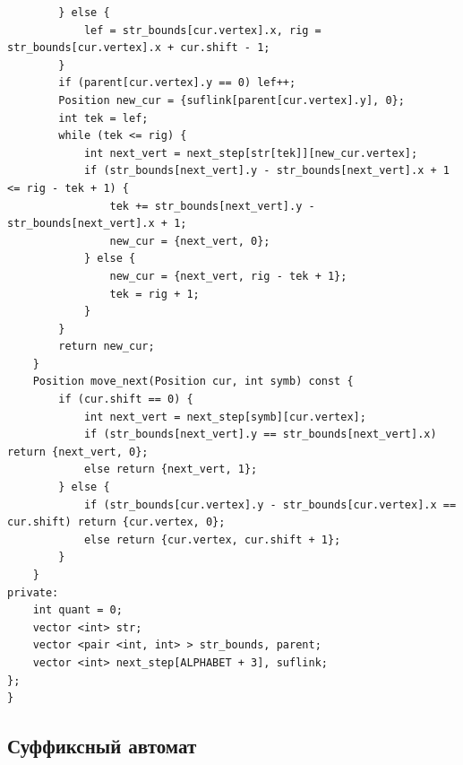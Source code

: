 \documentclass[10pt, portrait,letterpaper]{article}
\begin{document}
\begin{verbatim}
        } else {
            lef = str_bounds[cur.vertex].x, rig = str_bounds[cur.vertex].x + cur.shift - 1; 	
        }
        if (parent[cur.vertex].y == 0) lef++;
        Position new_cur = {suflink[parent[cur.vertex].y], 0};
        int tek = lef;
        while (tek <= rig) {
            int next_vert = next_step[str[tek]][new_cur.vertex];
            if (str_bounds[next_vert].y - str_bounds[next_vert].x + 1 <= rig - tek + 1) {
                tek += str_bounds[next_vert].y - str_bounds[next_vert].x + 1;
                new_cur = {next_vert, 0};
            } else {
                new_cur = {next_vert, rig - tek + 1};
                tek = rig + 1;
            }
        }
        return new_cur;
    }
    Position move_next(Position cur, int symb) const {
        if (cur.shift == 0) {
            int next_vert = next_step[symb][cur.vertex];
            if (str_bounds[next_vert].y == str_bounds[next_vert].x) return {next_vert, 0};
            else return {next_vert, 1};
        } else {
            if (str_bounds[cur.vertex].y - str_bounds[cur.vertex].x == cur.shift) return {cur.vertex, 0};
            else return {cur.vertex, cur.shift + 1};
        }
    }
private:
    int quant = 0;
    vector <int> str;
    vector <pair <int, int> > str_bounds, parent;
    vector <int> next_step[ALPHABET + 3], suflink;                   
};
}
\end{verbatim}

\subsection{Суффиксный автомат}
\end{document}
